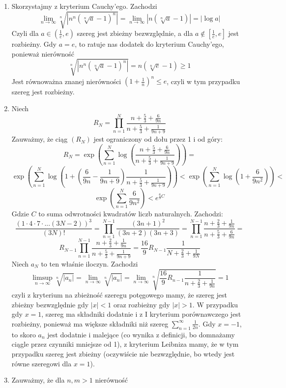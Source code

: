 \documentclass{../note}
\begin{document}
\begin{rozwiazanie}
\begin{enumerate}[label=(\alph*)]
    \item Skorzystajmy z kryterium Cauchy'ego. Zachodzi
    \[\lim_{n\to\infty} \sqrt[n]{\left|n^{n}(\sqrt[n]{a}-1)^{n}\right|} = \lim_{n\to\infty}|n(\sqrt[n]{a} - 1)| = |\log a|\]
    Czyli dla $a \in (\frac1e, e)$ szereg jest zbieżny bezwzględnie, a dla $a \notin [\frac1e, e]$ jest rozbieżny. Gdy $a = e$, to ratuje nas dodatek do kryterium Cauchy'ego, ponieważ nierówność
    \[\sqrt[n]{\left|n^{n}(\sqrt[n]{a}-1)^{n}\right|} = n(\sqrt[n]{e} - 1) \geq 1\]
    Jest równoważna znanej nierówności $\left(1 + \frac1n\right)^n \leq e$, czyli w tym przypadku szereg jest rozbieżny.
    \item Niech 
    \[R_N = \prod_{n=1}^{N} \frac{n + \frac53 + \frac6{9n}}{n + \frac53 + \frac1{9n+9}}\]
    Zauważmy, że ciąg $(R_N)$ jest ograniczony od dołu przez 1 i od góry:
    \[R_N = \exp\left(\sum_{n=1}^{N} \log\left(\frac{n + \frac53 + \frac6{9n}}{n + \frac53 + \frac1{9n+9}}\right)\right) =\]
    \[\exp\left(\sum_{n=1}^{N} \log\left(1 + \left(\frac{6}{9n} - \frac1{9n+9}\right) \frac{1}{n + \frac53 + \frac1{9n+9}}\right)\right) < \exp\left(\sum_{n=1}^{N} \log\left(1 + \frac{6}{9n^2}\right)\right) <\]
    \[\exp\left(\sum_{n=1}^{N} \frac{6}{9n^2}\right) < e^{\frac69C}\]
    Gdzie $C$ to suma odwrotności kwadratów liczb naturalnych. Zachodzi:
    \[\frac{(1\cdot4\cdot7\cdot...(3N-2))^{3}}{(3N)!} = \prod_{n=1}^{N-1} \frac{(3n+1)^2}{(3n+2)(3n+3)} = \prod_{n=1}^{N-1} \frac{n+\frac23+\frac{1}{9n}}{n+\frac53+\frac{6}{9n}}=\]
    \[R_{N-1}\prod_{n=1}^{N-1} \frac{n+\frac23+\frac{1}{9n}}{n+\frac53+\frac{1}{9n+9}} = \frac{16}{9}R_{N-1}\frac{1}{N+\frac23+\frac{1}{9N}}\]
    Niech $a_N$ to ten właśnie iloczyn. Zachodzi
    \[\limsup_{n\to\infty} \sqrt[n]{|a_n|} = \lim_{n\to\infty} \sqrt[n]{|a_n|} = \lim_{n\to\infty} \sqrt[n]{\frac{16}{9}R_{n-1}\frac{1}{n+\frac23+\frac{1}{9n}}} = 1\]
    czyli z kryterium na zbieżność szeregu potęgowego mamy, że szereg jest zbieżny bezwzględnie gdy $|x| < 1$ oraz rozbieżny gdy $|x| > 1$. W przypadku gdy $x = 1$, szereg ma składniki dodatnie i z I kryterium porównawczego jest rozbieżny, ponieważ ma większe składniki niż szereg $\sum_{n=1}^{\infty} \frac{1}{2n}$. Gdy $x = -1$, to skoro $a_n$ jest dodatnie i malejące (co wynika z definicji, bo domnażamy ciągle przez czynniki mniejsze od 1), z kryterium Leibniza mamy, że w tym przypadku szereg jest zbieżny (oczywiście nie bezwzględnie, bo wtedy jest równe szeregowi dla $x = 1$).
    \item Zauważmy, że dla $n, m > 1$ nierówność

\end{enumerate}
\end{rozwiazanie}
\end{document}
